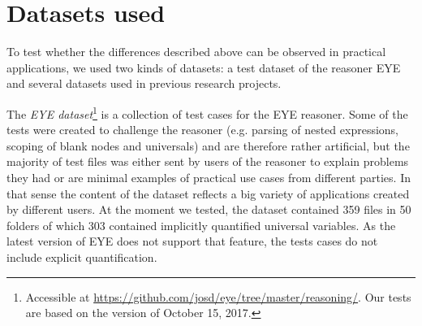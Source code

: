
\section{Datasets used}\label{data}
To test whether the differences described above can be observed in practical applications,
we used two kinds of datasets: a test dataset of the reasoner 
EYE and several datasets used in previous research projects.

The \emph{EYE dataset}\footnote{Accessible at \url{https://github.com/josd/eye/tree/master/reasoning/}. Our tests are based on the version of October 15, 2017.} 
%
is a collection of test cases for the EYE reasoner.
Some of the tests were created to challenge the reasoner (e.g. parsing of nested expressions, scoping of blank nodes and universals)
and are therefore rather artificial, 
 but the majority of test files was either sent by users of the reasoner to explain problems they had or are minimal examples of practical use cases from different parties.
 In that sense 
 the content of the dataset 
 reflects a big variety of applications created by different users.
 At the moment we tested, the dataset contained 359 \nthree files in 50 folders of which 303 contained implicitly 
quantified universal variables. 
As the latest version of EYE does not support that feature, the tests cases do not include explicit quantification. 

